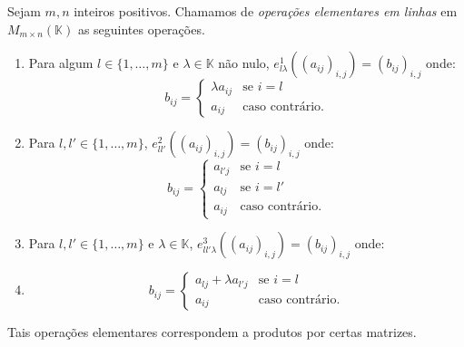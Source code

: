 \begin{definition}
    Sejam $m, n$ inteiros positivos.
    Chamamos de \emph{operações elementares em linhas} em $M_{m \times n}(\mathbb K)$ as seguintes operações.
        \begin{enumerate}
            \item Para algum $l\in \{1, \ldots, m\}$ e $\lambda \in \mathbb K$ não nulo, $e_{l\lambda}^1((a_{ij})_{i, j})=(b_{ij})_{i, j}$ onde:
            \begin{equation*}
                b_{ij} = \begin{cases}
                    \lambda a_{ij} & \text{se } i=l \\
                    a_{ij} & \text{caso contrário.}
                \end{cases}
            \end{equation*}
            \item Para $l, l'\in \{1, \ldots, m\}$, $e_{l l'}^2((a_{ij})_{i, j})=(b_{ij})_{i, j}$ onde:
            \begin{equation*}
                b_{ij} = \begin{cases}
                    a_{l'j} & \text{se } i=l \\
                    a_{lj} & \text{se } i=l' \\
                    a_{ij} & \text{caso contrário.}
                \end{cases}
            \end{equation*}
            \item Para $l, l'\in \{1, \ldots, m\}$ e $\lambda \in \mathbb K$, $e_{l l'\lambda}^3((a_{ij})_{i, j})=(b_{ij})_{i, j}$ onde:
            \item \begin{equation*}
                b_{ij} = \begin{cases}
                    a_{lj} + \lambda a_{l'j} & \text{se } i=l \\
                    a_{ij} & \text{caso contrário.}
                \end{cases}
            \end{equation*}
        \end{enumerate}
\end{definition}

Tais operações elementares correspondem a produtos por certas matrizes.

